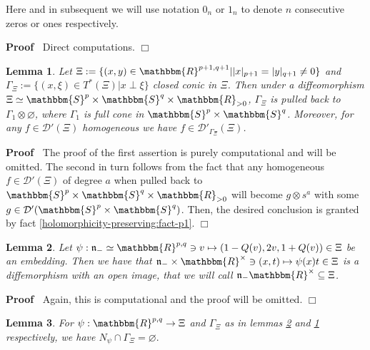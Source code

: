 \documentclass{article}
\newcommand{\assign}{:=}
\newcommand{\nobracket}{}
\newenvironment{proof}{\noindent\textbf{Proof\ }}{\hspace*{\fill}$\Box$\medskip}
\numberwithin{definition}{section}
\newtheorem{lemma}{Lemma}
\numberwithin{lemma}{section}
\numberwithin{proposition}{section}
{\theorembodyfont{\rmfamily}\newtheorem{remark}{Remark}
\numberwithin{remark}{section}
}
\begin{document}
\begin{remark}
  Here and in subsequent we will use notation $0_n$ or $1_n$ to denote $n$
  consecutive zeros or ones respectively.
\end{remark}

\begin{proof}
  Direct computations.
\end{proof}

\begin{lemma}
  \label{k-finite:lem-homocone}Let $\Xi \assign \{ ( x, y) \in \mathbbm{R}^{p
  + 1, q + 1} |  | x |_{p + 1} = | y |_{q + 1} \neq 0 \}$ and $\Gamma_{\Xi}
  \assign \{ ( x, \xi) \in T^{\nobracket \ast \nobracket}_{} ( \Xi) | x \perp
  \xi \}$ closed conic in $\Xi$. Then under a diffeomorphism $\Xi \simeq
  \mathbbm{S}^p \times \mathbbm{S}^q \times \mathbbm{R}_{> 0}$, $\Gamma_{\Xi}$
  is pulled back to $\Gamma_1 \otimes \varnothing$, where $\Gamma_1$ is full
  cone in $\mathbbm{S}^p \times \mathbbm{S}^q$. Moreover, for any $f \in
  \mathcal{D}' ( \Xi)$ homogeneous we have $f \in \mathcal{D}'_{\Gamma_{\Xi}}
  ( \Xi)$.
\end{lemma}

\begin{proof}
  The proof of the first assertion is purely computational and will be
  omitted. The second in turn follows from the fact that any homogeneous $f
  \in \mathcal{D}' ( \Xi)$ of degree $a$ when pulled back to $\mathbbm{S}^p
  \times \mathbbm{S}^q \times \mathbbm{R}_{> 0}$ will become $g \otimes s^a$
  with some $g \in \mathcal{D}' ( \mathbbm{S}^p \times \mathbbm{S}^q)$. Then,
  the desired conclusion is granted by fact
  \ref{holomorphicity-preserving:fact-p1}.
\end{proof}

\begin{lemma}
  \label{k-finite:lem-claim1-aux}Let $\psi : \mathfrak{n}_- \simeq
  \mathbbm{R}^{p, q} \ni v \mapsto ( 1 - Q ( v), 2 v, 1 + Q ( v)) \in \Xi$ be
  an embedding. Then we have that $\mathfrak{n}_- \times \mathbbm{R}^{\times}
  \ni ( x, t) \mapsto \psi ( x) t \in \Xi$ is a diffemorphism with an open
  image, that we will call $\mathfrak{n}_- \mathbbm{R}^{\times} \subseteq
  \Xi$.
\end{lemma}

\begin{proof}
  Again, this is computational and the proof will be omitted.
\end{proof}

\begin{lemma}
  \label{k-finite:lem-restriction-to-N}For $\psi : \mathbbm{R}^{p, q}
  \rightarrow \Xi$ and $\Gamma_{\Xi}$ as in lemmas
  \ref{k-finite:lem-claim1-aux} and \ref{k-finite:lem-homocone} respectively,
  we have $N_{\psi} \cap \Gamma_{\Xi} = \varnothing .$
\end{lemma}
\end{document}
